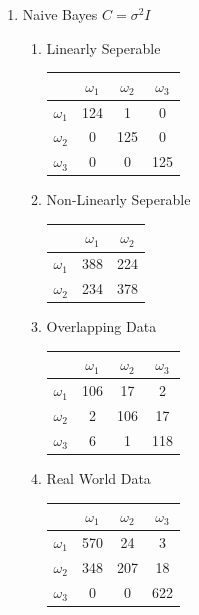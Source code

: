 \documentclass[a4paper]{article}
\begin{document}
\begin{enumerate}
\newpage

\item Naive Bayes $C = \sigma^2I$
\begin{multicols}{2}
\begin{enumerate}
\item Linearly Seperable

\begin{tabular}{ l | c | c | c | }

& $\omega_1$ & $\omega_2$ & $\omega_3$ \\
\hline
  $\omega_1$ & 124 & 1 & 0 \\ 
\hline
  $\omega_2$ & 0 & 125 & 0 \\
\hline
  $\omega_3$ & 0 & 0 & 125 \\
\hline
\end{tabular}

\item Non-Linearly Seperable

\begin{tabular}{ l | c | c |}

& $\omega_1$ & $\omega_2$ \\
\hline
  $\omega_1$ & 388 & 224 \\ 
\hline
  $\omega_2$ & 234 & 378 \\
\hline
\end{tabular}
\newline

\item Overlapping Data

\begin{tabular}{ l | c | c | c | }

& $\omega_1$ & $\omega_2$ & $\omega_3$ \\
\hline
  $\omega_1$ & 106 & 17 & 2 \\ 
\hline
  $\omega_2$ & 2 & 106 & 17 \\
\hline
  $\omega_3$ & 6 & 1 & 118 \\
\hline
\end{tabular}

\item Real World Data

\begin{tabular}{ l | c | c | c | }
& $\omega_1$ & $\omega_2$ & $\omega_3$ \\
\hline
  $\omega_1$ & 570 & 24 & 3 \\ 
\hline
  $\omega_2$ & 348 & 207 & 18 \\
\hline
  $\omega_3$ & 0 & 0 & 622 \\
\hline
\end{tabular}
\end{enumerate}
\end{multicols}


\end{enumerate}
\end{document}
